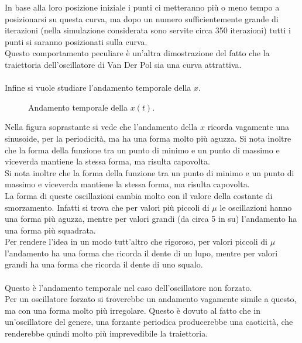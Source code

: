 \documentclass[12pt]{article}
\begin{document}
In base alla loro posizione iniziale i punti ci metteranno più o meno tempo a posizionarsi su questa curva, ma dopo un numero sufficientemente grande di iterazioni (nella simulazione considerata sono servite circa 350 iterazioni) tutti i punti si saranno posizionati sulla curva. \\
Questo comportamento peculiare è un'altra dimostrazione del fatto che la traiettoria dell'oscillatore di Van Der Pol sia una curva attrattiva. \\ \\
Infine si vuole studiare l'andamento temporale della $x$. 
\begin{figure}[H]
	
	\caption{Andamento temporale della $x(t).$}
\end{figure}
Nella figura soprastante si vede che l'andamento della $x$ ricorda vagamente una sinusoide, per la periodicità, ma ha una forma molto più aguzza. Si nota inoltre che la forma della funzione tra un punto di minimo e un punto di massimo e viceverda mantiene la stessa forma, ma risulta capovolta. \\
Si nota inoltre che la forma della funzione tra un punto di minimo e un punto di massimo e viceverda mantiene la stessa forma, ma risulta capovolta. \\
La forma di queste oscillazioni cambia molto con il valore della costante di smorzamento. Infatti si trova che per valori più piccoli di $\mu$ le oscillazioni hanno una forma più aguzza, mentre per valori grandi (da circa 5 in su) l'andamento ha una forma più squadrata. \\
Per rendere l'idea in un modo tutt'altro che rigoroso, per valori piccoli di $\mu$ l'andamento ha una forma che ricorda il dente di un lupo, mentre per valori grandi ha una forma che ricorda il dente di uno squalo. \\ \\ 
Questo è l'andamento temporale nel caso dell'oscillatore non forzato. \\
Per un oscillatore forzato si troverebbe un andamento vagamente simile a questo, ma con una forma molto più irregolare. Questo è dovuto al fatto che in un'oscillatore del genere, una forzante periodica producerebbe una caoticità, che renderebbe quindi molto più imprevedibile la traiettoria.
\end{document}
